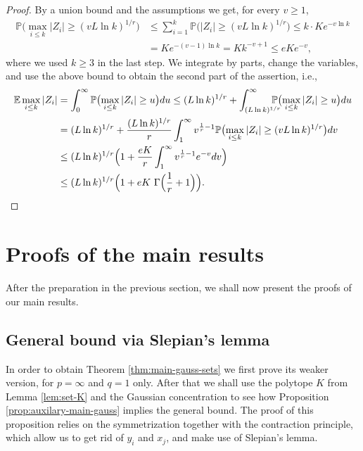 \documentclass[a4paper]{amsart}
\theoremstyle{definition}
\theoremstyle{remark}
\numberwithin{equation}{section}
\newcommand*{\EE}{\mathbb{E}}
\newcommand*{\PP}{\mathbb{P}}
\begin{document}
\begin{proof}
	By a union bound and the assumptions we get, for every $v\ge 1$,
	\begin{align*}
		\PP\bigl(\max_{i\le k} |Z_i|\ge (vL \ln k)^{1/r}\bigr)
		&\leq \sum_{i=1}^k \PP\bigl( |Z_i|\ge (vL \ln k)^{1/r}\bigr)
		\leq k\cdot Ke^{-v\ln k} \\
		&=Ke^{-(v-1)\ln k}
		= K k^{-v+1} \leq eKe^{-v},
	\end{align*}
	where we used $k\geq 3$ in the last step.
	We integrate by parts, change the variables, and use the above bound to obtain the second part of the assertion, i.e.,
	\begin{align*}
		\EE\max_{i\le k} |Z_i|
		&= \int_0^\infty \PP\bigl(\max_{i\le k} |Z_i|\ge u\bigr) du
		\le (L \ln k)^{1/r} + \int_{(L \ln k)^{1/r}}^\infty \hspace{-0.4 cm} \PP\bigl(\max_{i\le k} |Z_i|\ge u\bigr) du	\\
		&=(L \ln k)^{1/r} + \frac{(L \ln k)^{1/r} }r \int_{1}^\infty v^{\frac 1r -1}
		\PP\bigl(\max_{i\le k} |Z_i|\ge (vL \ln k)^{1/r}\bigr) dv		\\
		&\leq (L \ln k)^{1/r} \Bigl(1 + \frac {eK}r \int_{1}^\infty v^{\frac 1r -1}e^{-v} dv \Bigr) 	\\
		&\leq (L \ln k)^{1/r} \Bigl(1 + eK\ \Gamma\Bigl(\frac 1r +1\Bigr) \Bigr). 	\qedhere
	\end{align*}
\end{proof}

%
\section{Proofs of the main results}
\label{sec:Slepian-bound}
%


    After the preparation in the previous section, we shall now present the proofs of our main results.

\subsection{General bound via Slepian's lemma}
\label{subsect:proof-main-thm}


In order to obtain Theorem \ref{thm:main-gauss-sets} we first prove its weaker version, for $p=\infty$ and $q=1$ only.
After that we shall use the polytope $K$ from Lemma \ref{lem:set-K} 
and the Gaussian concentration to see how Proposition \ref{prop:auxilary-main-gauss} implies the general bound. The proof of this proposition relies on the symmetrization together with the contraction principle, which allow us to get rid of $y_i$ and $x_j$, and make use of Slepian's lemma.
\end{document}
